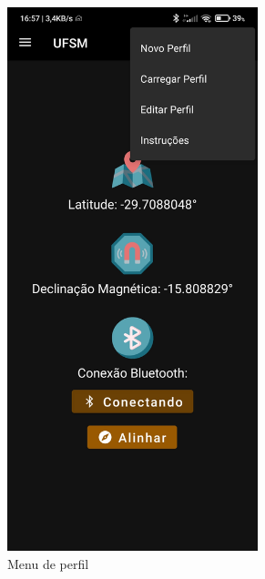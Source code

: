 \begin{figure}[!htb]
\begin{subfigure}[b]{0.3\textwidth}
		\includegraphics[width=0.8\textwidth]{figuras/desAplicativo/overflow}
		\caption{Menu de perfil}
		\label{azim}
	\end{subfigure}
	\hfill
	\begin{subfigure}[b]{0.3\textwidth}
		\centering

\end{subfigure}
\end{figure}
